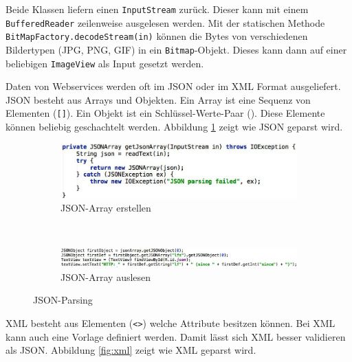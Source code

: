 Beide Klassen liefern einen \texttt{InputStream} zurück. Dieser kann mit einem \texttt{BufferedReader} zeilenweise ausgelesen werden. Mit der statischen Methode \texttt{BitMapFactory.decodeStream(in)} können die Bytes von verschiedenen Bildertypen (JPG, PNG, GIF) in ein \texttt{Bitmap}-Objekt. Dieses kann dann auf einer beliebigen \texttt{ImageView} als Input gesetzt werden.

Daten von Webservices werden oft im JSON oder im XML Format ausgeliefert. JSON besteht aus Arrays und Objekten. Ein Array ist eine Sequenz von Elementen (\texttt{[]}). Ein Objekt ist ein Schlüssel-Werte-Paar (\texttt{{}}). Diese Elemente können beliebig geschachtelt werden. Abbildung \ref{fig:json} zeigt wie JSON geparst wird.

\begin{figure}
	\centering
	\begin{subfigure}[b]{0.48\textwidth}
		\includegraphics[width=\textwidth]{fig/json-array-erstellen}
		\caption{JSON-Array erstellen}
	\end{subfigure}
	~
	\begin{subfigure}[b]{0.48\textwidth}
		\includegraphics[width=\textwidth]{fig/json-array-auslesen}
		\caption{JSON-Array auslesen}
	\end{subfigure}
	\caption{JSON-Parsing}
	\label{fig:json}
\end{figure}

XML besteht aus Elementen (\texttt{<>}) welche Attribute besitzen können. Bei XML kann auch eine Vorlage definiert werden. Damit lässt sich XML besser validieren als JSON. Abbildung \ref{fig:xml} zeigt wie XML geparst wird.

